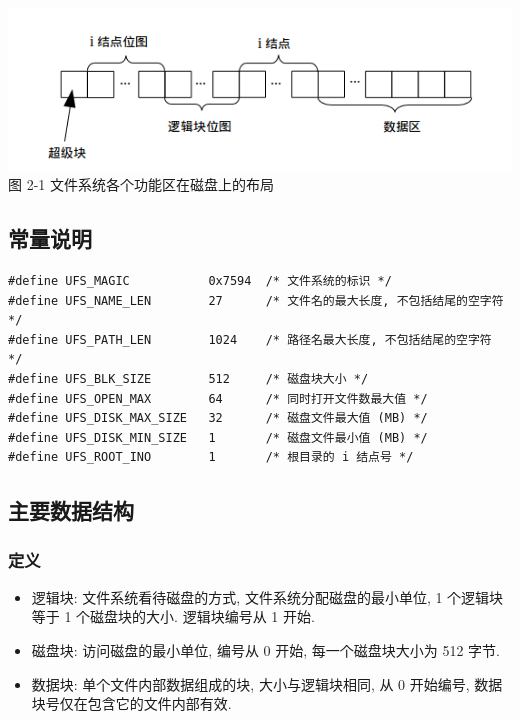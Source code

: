 \documentclass[nofonts]{ctexart}
\begin{document}
\includegraphics[width=15cm]{./images/./layout.png}\\图 2-1
文件系统各个功能区在磁盘上的布局

\subsection{常量说明}\label{ux5e38ux91cfux8bf4ux660e}

\begin{verbatim}
#define UFS_MAGIC           0x7594  /* 文件系统的标识 */
#define UFS_NAME_LEN        27      /* 文件名的最大长度, 不包括结尾的空字符 */
#define UFS_PATH_LEN        1024    /* 路径名最大长度, 不包括结尾的空字符 */
#define UFS_BLK_SIZE        512     /* 磁盘块大小 */
#define UFS_OPEN_MAX        64      /* 同时打开文件数最大值 */
#define UFS_DISK_MAX_SIZE   32      /* 磁盘文件最大值 (MB) */
#define UFS_DISK_MIN_SIZE   1       /* 磁盘文件最小值 (MB) */
#define UFS_ROOT_INO        1       /* 根目录的 i 结点号 */
\end{verbatim}

\subsection{主要数据结构}\label{ux4e3bux8981ux6570ux636eux7ed3ux6784}

\subsubsection{定义}\label{ux5b9aux4e49-1}

\begin{itemize}
\item
  逻辑块: 文件系统看待磁盘的方式, 文件系统分配磁盘的最小单位, 1
  个逻辑块等于 1 个磁盘块的大小. 逻辑块编号从 1 开始.
\item
  磁盘块: 访问磁盘的最小单位, 编号从 0 开始, 每一个磁盘块大小为 512
  字节.
\item
  数据块: 单个文件内部数据组成的块, 大小与逻辑块相同, 从 0 开始编号,
  数据块号仅在包含它的文件内部有效.
\end{itemize}
\end{document}
